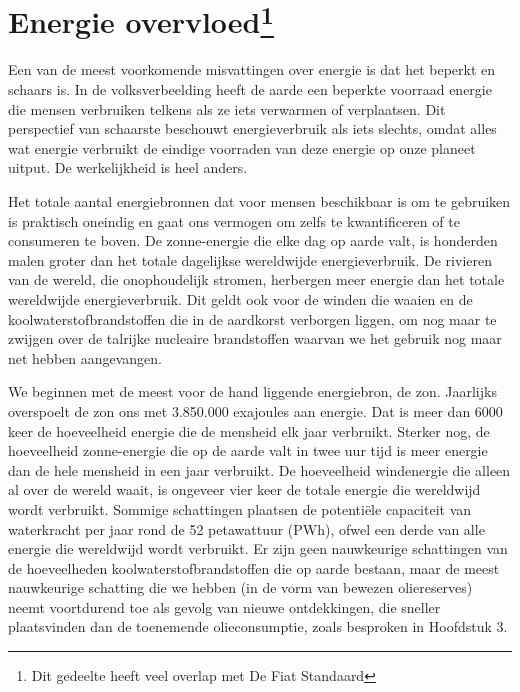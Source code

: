 \section[Energie overvloed]{Energie overvloed\footnote{Dit gedeelte heeft veel overlap met De Fiat Standaard}}

Een van de meest voorkomende misvattingen over energie is dat het beperkt en schaars is. In de volksverbeelding heeft de aarde een beperkte voorraad energie die mensen verbruiken telkens als ze iets verwarmen of verplaatsen. Dit perspectief van schaarste beschouwt energieverbruik als iets slechts, omdat alles wat energie verbruikt de eindige voorraden van deze energie op onze planeet uitput. De werkelijkheid is heel anders.

Het totale aantal energiebronnen dat voor mensen beschikbaar is om te gebruiken is praktisch oneindig en gaat ons vermogen om zelfs te kwantificeren of te consumeren te boven. De zonne-energie die elke dag op aarde valt, is honderden malen groter dan het totale dagelijkse wereldwijde energieverbruik. De rivieren van de wereld, die onophoudelijk stromen, herbergen meer energie dan het totale wereldwijde energieverbruik. Dit geldt ook voor de winden die waaien en de koolwaterstofbrandstoffen die in de aardkorst verborgen liggen, om nog maar te zwijgen over de talrijke nucleaire brandstoffen waarvan we het gebruik nog maar net hebben aangevangen.

We beginnen met de meest voor de hand liggende energiebron, de zon. Jaarlijks overspoelt de zon ons met 3.850.000 exajoules aan energie. Dat is meer dan 6000 keer de hoeveelheid energie die de mensheid elk jaar verbruikt. Sterker nog, de hoeveelheid zonne-energie die op de aarde valt in twee uur tijd is meer energie dan de hele mensheid in een jaar verbruikt. De hoeveelheid windenergie die alleen al over de wereld waait, is ongeveer vier keer de totale energie die wereldwijd wordt verbruikt. Sommige schattingen plaatsen de potentiële capaciteit van waterkracht per jaar rond de 52 petawattuur (PWh), ofwel een derde van alle energie die wereldwijd wordt verbruikt. Er zijn geen nauwkeurige schattingen van de hoeveelheden koolwaterstofbrandstoffen die op aarde bestaan, maar de meest nauwkeurige schatting die we hebben (in de vorm van bewezen oliereserves) neemt voortdurend toe als gevolg van nieuwe ontdekkingen, die sneller plaatsvinden dan de toenemende olieconsumptie, zoals besproken in Hoofdstuk 3.

